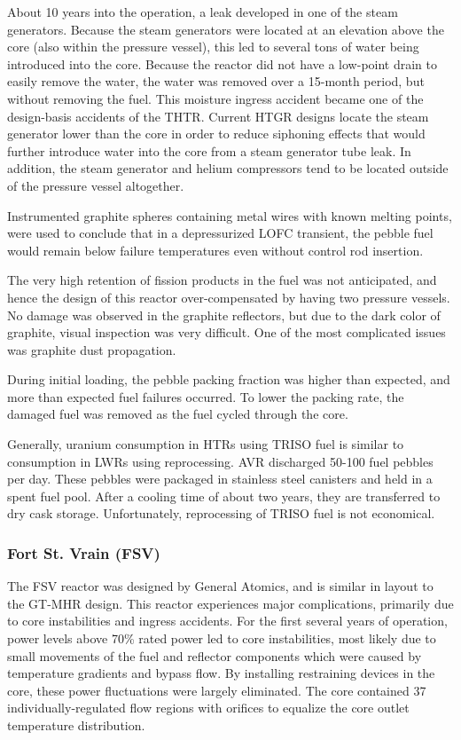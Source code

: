 \documentclass[10pt]{article}
\numberwithin{equation}{section} %
\begin{document}
About 10 years into the operation, a leak developed in one of the steam generators. Because the steam generators were located at an elevation above the core (also within the pressure vessel), this led to several tons of water being introduced into the core. Because the reactor did not have a low-point drain to easily remove the water, the water was removed over a 15-month period, but without removing the fuel. This moisture ingress accident became one of the design-basis accidents of the THTR. Current HTGR designs locate the steam generator lower than the core in order to reduce siphoning effects that would further introduce water into the core from a steam generator tube leak. In addition, the steam generator and helium compressors tend to be located outside of the pressure vessel altogether.

Instrumented graphite spheres containing metal wires with known melting points, were used to conclude that in a depressurized LOFC transient, the pebble fuel would remain below failure temperatures even without control rod insertion.


The very high retention of fission products in the fuel was not anticipated, and hence the design of this reactor over-compensated by having two pressure vessels. No damage was observed in the graphite reflectors, but due to the dark color of graphite, visual inspection was very difficult. One of the most complicated issues was graphite dust propagation.

During initial loading, the pebble packing fraction was higher than expected, and more than expected fuel failures occurred. To lower the packing rate, the damaged fuel was removed as the fuel cycled through the core.

Generally, uranium consumption in HTRs using TRISO fuel is similar to consumption in LWRs using reprocessing. AVR discharged 50-100 fuel pebbles per day. These pebbles were packaged in stainless steel canisters and held in a spent fuel pool. After a cooling time of about two years, they are transferred to dry cask storage. Unfortunately, reprocessing of TRISO fuel is not economical.

\subsubsection{Fort St. Vrain (FSV)}
The FSV reactor was designed by General Atomics, and is similar in layout to the GT-MHR design. This reactor experiences major complications, primarily due to core instabilities and ingress accidents. For the first several years of operation, power levels above 70\% rated power led to core instabilities, most likely due to small movements of the fuel and reflector components which were caused by temperature gradients and bypass flow. By installing restraining devices in the core, these power fluctuations were largely eliminated. The core contained 37 individually-regulated flow regions with orifices to equalize the core outlet temperature distribution. 
\end{document}
